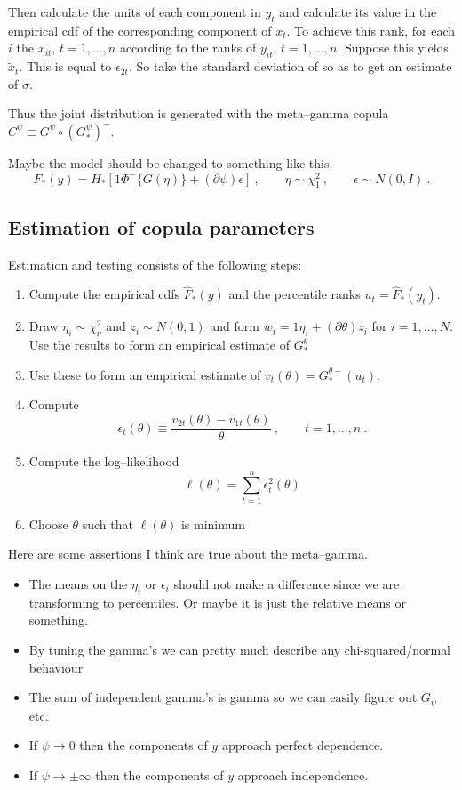 \documentclass[a4paper,12pt]{article}
\newcommand{\eps}{\epsilon}
\begin{document}
Then calculate the units of each component in  $y_t$ and calculate its value in the empirical cdf of the corresponding component of $x_t$.   To achieve this rank, for each $i$ the  $x_{it}$, $t=1,\ldots,n$ according to the ranks of  $y_{it}$, $t=1,\ldots,n$.  Suppose this yields $\tilde x_t$.  This is equal to $ \eps_{2t}$.  So take the standard deviation of so as to get an estimate of $\sigma$.


 Thus the joint distribution is generated with the meta--gamma copula $C^\psi\equiv G^\psi\circ (G_*^\psi)^-$.

Maybe the model should be changed to something like this
$$
F_*(y) = H_*[1\Phi^-\{G(\eta)\}+(\partial\psi)\eps]\ , \qquad \eta\sim\chi^2_1\ , \qquad \eps\sim N(0,I)\ .
$$

\subsection{Estimation of copula parameters}
  Estimation and testing consists of the following steps:
\begin{enumerate}
  \item Compute the empirical cdfs $\hat F_*(y)$ and the percentile ranks $u_t=\hat F_*(y_t)$.
  \item Draw $\eta_i\sim \chi^2_\nu$ and $z_i\sim N(0,1)$ and form $w_i=1\eta_i+(\partial \theta)z_i$ for $i=1,\ldots,N$. Use the results to form an empirical estimate of $G_*^\theta$
  \item Use these to form an empirical estimate of $v_t(\theta)=G_*^{\theta-}(u_t)$.
  \item Compute
  $$
  \eps_{t}(\theta)\equiv \frac{v_{2t}(\theta) - v_{1t}(\theta)}{\theta}\ , \qquad t=1,\ldots,n\ .
  $$
  \item Compute the log--likelihood
  $$
  \ell(\theta) = \sum_{t=1}^n\eps_t^2(\theta)
  $$
  \item Choose $\theta$ such that $\ell(\theta)$ is minimum
\end{enumerate}

Here are some assertions I think are true about the meta--gamma.
\begin{itemize}
  \item The means on the $\eta_i$ or $\eps_i$ should not make a difference since we are transforming to percentiles.  Or maybe it is just the relative means or something.
  \item By tuning the gamma's we can pretty much describe any chi-squared/normal behaviour
  \item The sum of independent gamma's is gamma so we can easily figure out $G_\psi$ etc.
  \item If $\psi\rightarrow 0$ then the components of $y$ approach perfect dependence.
  \item If $\psi\rightarrow \pm\infty$ then the components of $y$ approach independence.
\end{itemize}
\end{document}
